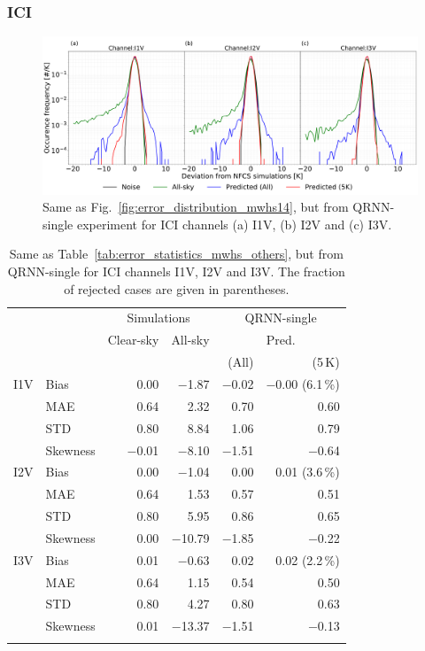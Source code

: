 \documentclass[amt, manuscript]{copernicus}
\begin{document}
\subsubsection{ICI}
%
\begin{figure}[t]
	\includegraphics[width=\textwidth]{Figures/fig08.pdf} 
	\caption{Same as Fig.~\ref{fig:error_distribution_mwhs14}, but from QRNN-single experiment for ICI channels (a) I1V, (b) I2V and (c) I3V. }
	\label{fig:error_distributions}	
\end{figure}
\begin{table}[t]
	\caption{ Same as Table~\ref{tab:error_statistics_mwhs_others}, but from QRNN-single for ICI channels I1V, I2V and I3V. The fraction of rejected cases are given in parentheses.}
	\label{tab:error_statistics_ici}
	\begin{tabular}{llrr|rr}
		\tophline
		&&\multicolumn{2}{c|}{Simulations}& \multicolumn{2}{c}{QRNN-single} \\
		\cline{3-6}
		&&Clear-sky &   All-sky &  \multicolumn{2}{c}{Pred.}  \\
		&&			   &			&	(All) & (5\,K) \\
		\middlehline
		
		I1V&  Bias      &  0.00 &$-$1.87 &$-$0.02 &$-$0.00 (6.1\,\%)  \\
		&MAE       		&  0.64 &  2.32 &  0.70 &  0.60   \\
		&STD       		&  0.80 &  8.84 &  1.06 &  0.79   \\
		&Skewness 		&$-$0.01 &$-$8.10 &$-$1.51 &$-$0.64  \\
		\middlehline
		I2V & Bias      & 0.00 & $-$1.04 &  0.00 &  0.01 (3.6\,\%)  \\
		&MAE       		& 0.64 &   1.53 &  0.57 &  0.51 \\
		&STD       		& 0.80 &   5.95 &  0.86 &  0.65 \\
		&Skewness 		& 0.00 &$-$10.79 &$-$1.85 &$-$0.22  \\
		\middlehline	
		I3V & Bias      & 0.01 & $-$0.63 &  0.02 &  0.02 (2.2\,\%)  \\
		&MAE       		& 0.64 &   1.15 &  0.54 &  0.50  \\
		&STD       		& 0.80 &   4.27 &  0.80 &  0.63  \\
		&Skewness 		& 0.01 &$-$13.37 &$-$1.51 &$-$0.13  \\
		\bottomhline
	\end{tabular}
	\belowtable{} %
\end{table}
\end{document}
